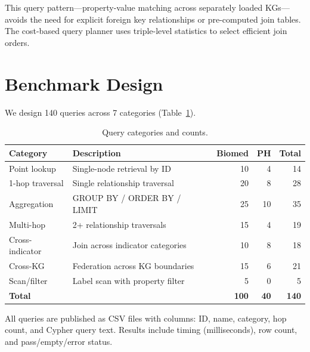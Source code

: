 \documentclass[11pt]{article}
\begin{document}
This query pattern---property-value matching across separately loaded KGs---avoids the need for explicit foreign key relationships or pre-computed join tables. The cost-based query planner uses triple-level statistics to select efficient join orders.

\section{Benchmark Design}
\label{sec:benchmark}

We design 140 queries across 7 categories (Table~\ref{tab:query-categories}).

\begin{table}[H]
  \centering
  \caption{Query categories and counts.}
  \label{tab:query-categories}
  \begin{tabular}{@{}llrrr@{}}
    \toprule
    \textbf{Category} & \textbf{Description} & \textbf{Biomed} & \textbf{PH} & \textbf{Total} \\
    \midrule
    Point lookup     & Single-node retrieval by ID       & 10 & 4  & 14 \\
    1-hop traversal  & Single relationship traversal     & 20 & 8  & 28 \\
    Aggregation      & GROUP BY / ORDER BY / LIMIT       & 25 & 10 & 35 \\
    Multi-hop        & 2+ relationship traversals        & 15 & 4  & 19 \\
    Cross-indicator  & Join across indicator categories   & 10 & 8  & 18 \\
    Cross-KG         & Federation across KG boundaries    & 15 & 6  & 21 \\
    Scan/filter      & Label scan with property filter    & 5  & 0  & 5 \\
    \midrule
    \textbf{Total}   &                                   & \textbf{100} & \textbf{40} & \textbf{140} \\
    \bottomrule
  \end{tabular}
\end{table}

All queries are published as CSV files with columns: ID, name, category, hop count, and Cypher query text. Results include timing (milliseconds), row count, and pass/empty/error status.

\end{document}
